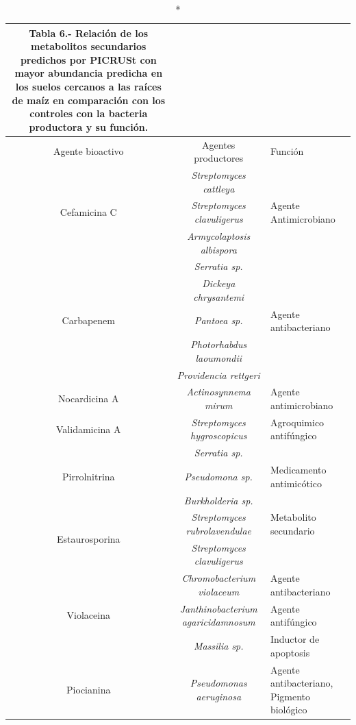 \documentclass[12pt,letterpaper,oneside]{report}
\begin{document}
\begin{longtable}[c]{ccm{5cm}}
\caption*{\textbf{Tabla 6.-} Relación de los metabolitos secundarios predichos por PICRUSt con mayor abundancia predicha en los suelos cercanos a las raíces de maíz en comparación con los controles con la bacteria productora y su función.} \label{Tabla 6}\\
\toprule[0.5mm]
Agente bioactivo & Agentes productores & Función  \\ 
\midrule
\multirow{3}{*}{Cefamicina C} & \textit{Streptomyces cattleya} & \\
& \textit{Streptomyces clavuligerus} & Agente Antimicrobiano\\
& \textit{Armycolaptosis albispora} & \\ 
\hline
\multirow{5}{*}{Carbapenem} & \textit{Serratia sp.} & \\
& \textit{Dickeya chrysantemi} & \\
& \textit{Pantoea sp.} & Agente antibacteriano\\ 
& \textit{Photorhabdus laoumondii} & \\ 
& \textit{Providencia rettgeri} & \\ 
\hline
Nocardicina A & \textit{Actinosynnema mirum} & Agente antimicrobiano  \\ 
\hline
Validamicina A & \textit{Streptomyces hygroscopicus} & Agroquimico antifúngico  \\ 
 \hline
\multirow{3}{*}{Pirrolnitrina} & \textit{Serratia sp.} & \\
& \textit{Pseudomona sp.} & Medicamento antimicótico\\
& \textit{Burkholderia sp.} &\\ 
\hline
\multirow{2}{*}{Estaurosporina} & \textit{Streptomyces rubrolavendulae} & Metabolito secundario \\
& \textit{Streptomyces clavuligerus} & \\
\hline
\multirow{3}{*}{Violaceina} & \textit{Chromobacterium violaceum} & Agente antibacteriano\\
& \textit{Janthinobacterium agaricidamnosum} & Agente antifúngico\\

& \textit{Massilia sp.} & Inductor de apoptosis\\
\hline
Piocianina & \textit{Pseudomonas aeruginosa} & Agente antibacteriano, Pigmento biológico


\end{longtable}
\end{document}
